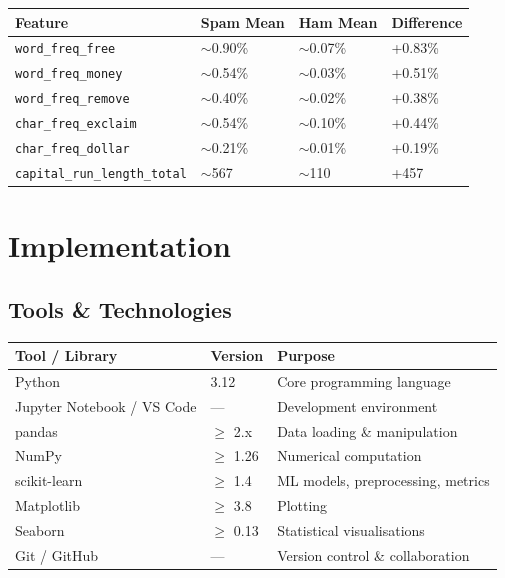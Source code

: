 \documentclass[12pt, a4paper]{article}
\begin{document}
\begin{table}[h]
\centering
\begin{tabular}{|l|l|l|l|}
\hline
\textbf{Feature} & \textbf{Spam Mean} & \textbf{Ham Mean} & \textbf{Difference} \\ \hline
\texttt{word\_freq\_free} & $\sim$0.90\% & $\sim$0.07\% & +0.83\% \\ \hline
\texttt{word\_freq\_money} & $\sim$0.54\% & $\sim$0.03\% & +0.51\% \\ \hline
\texttt{word\_freq\_remove} & $\sim$0.40\% & $\sim$0.02\% & +0.38\% \\ \hline
\texttt{char\_freq\_exclaim} & $\sim$0.54\% & $\sim$0.10\% & +0.44\% \\ \hline
\texttt{char\_freq\_dollar} & $\sim$0.21\% & $\sim$0.01\% & +0.19\% \\ \hline
\texttt{capital\_run\_length\_total} & $\sim$567 & $\sim$110 & +457 \\ \hline
\end{tabular}
\end{table}


\section{Implementation}

\subsection{Tools \& Technologies}

\begin{table}[h]
\centering
\begin{tabular}{|l|l|l|}
\hline
\textbf{Tool / Library} & \textbf{Version} & \textbf{Purpose} \\ \hline
Python & 3.12 & Core programming language \\ \hline
Jupyter Notebook / VS Code & --- & Development environment \\ \hline
pandas & $\ge$ 2.x & Data loading \& manipulation \\ \hline
NumPy & $\ge$ 1.26 & Numerical computation \\ \hline
scikit-learn & $\ge$ 1.4 & ML models, preprocessing, metrics \\ \hline
Matplotlib & $\ge$ 3.8 & Plotting \\ \hline
Seaborn & $\ge$ 0.13 & Statistical visualisations \\ \hline
Git / GitHub & --- & Version control \& collaboration \\ \hline
\end{tabular}
\end{table}
\end{document}
